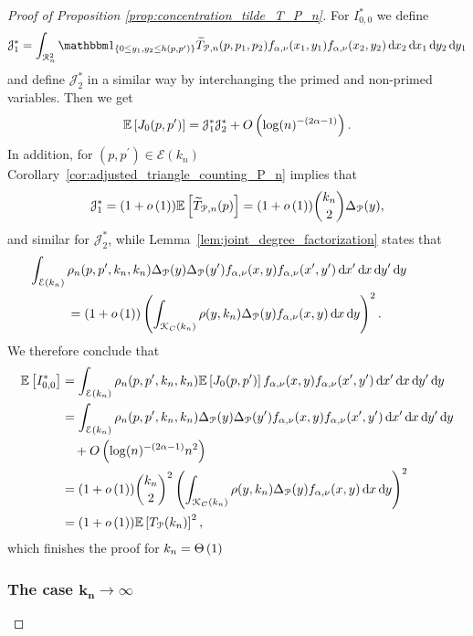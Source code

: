 \begin{proof}[Proof of Proposition \ref{prop:concentration_tilde_T_P_n}]
For $I_{0,0}^\ast$ we define
\[
	\mathcal{J}_1^\ast = \int_{\Rcal_n^2} \ind{0\le y_1, y_2 \le h(p,p^\prime)} \widetilde{T}_{\Pcal,n}(p,p_1,p_2) 
			f_{\alpha,\nu}(x_1,y_1)	f_{\alpha,\nu}(x_2,y_2) \dd x_2 \dd x_1 \dd y_2 \dd y_1
\] 
and define $\mathcal{J}_2^\ast$ in a similar way by interchanging the primed and non-primed variables. Then we get
\[
	\mathbb{E}\left[J_0(p,p^\prime)\right] = \mathcal{J}_1^\ast \mathcal{J}_2^\ast + O\left(\log(n)^{-(2\alpha - 1)}\right).
\]
In addition, for $(p,p^\prime) \in \mathcal{E}(k_n)$ Corollary~\ref{cor:adjusted_triangle_counting_P_n} implies that 
\[
	\mathcal{J}_1^\ast = (1+o\left(1\right))\mathbb{E}\left[\widetilde{T}_{{\mathcal P},n}(p)\right] = (1 + o\left(1\right))\binom{k_n}{2} \Delta_{{\mathcal P}}(y),
\] 
and similar for $\mathcal{J}_2^\ast$, while Lemma~\ref{lem:joint_degree_factorization} states that
\begin{align*}
	&\hspace{-30pt}\int_{\mathcal{E}(k_n)} \rho_{n}(p,p^\prime,k_n,k_n) \Delta_\Pcal(y) \Delta_\Pcal(y^\prime)
		f_{\alpha,\nu}(x,y) f_{\alpha, \nu}(x^\prime, y^\prime) \dd x^\prime \dd x \dd y^\prime \dd y\\
	&= (1+\smallO{1})\left(\int_{\Kcal_C(k_n)} \rho(y,k_n) \Delta_\Pcal(y) f_{\alpha,\nu}(x,y) \dd x \dd y\right)^2.
\end{align*}
We therefore conclude that
\begin{align*}
	\mathbb{E}\left[I_{0,0}^\ast\right] 
	&= \int_{\mathcal{E}(k_n)} \rho_{n}(p,p^\prime,k_n,k_n) \mathbb{E}\left[J_0(p,p^\prime)\right]
		f_{\alpha,\nu}(x,y) f_{\alpha, \nu}(x^\prime, y^\prime) \operatorname{\mathrm{d}\hspace{-2pt}} x^\prime \operatorname{\mathrm{d}\hspace{-2pt}} x \operatorname{\mathrm{d}\hspace{-2pt}} y^\prime \operatorname{\mathrm{d}\hspace{-2pt}} y \\
	&= \int_{\mathcal{E}(k_n)} \rho_{n}(p,p^\prime,k_n,k_n) \Delta_{{\mathcal P}}(y) \Delta_{{\mathcal P}}(y^\prime)
		f_{\alpha,\nu}(x,y) f_{\alpha, \nu}(x^\prime, y^\prime) \operatorname{\mathrm{d}\hspace{-2pt}} x^\prime \operatorname{\mathrm{d}\hspace{-2pt}} x \operatorname{\mathrm{d}\hspace{-2pt}} y^\prime \operatorname{\mathrm{d}\hspace{-2pt}} y\\
	&\hspace{10pt}+ O\left(\log(n)^{-(2\alpha - 1)}n^2\right) \\
	&= (1 + o\left(1\right)) \binom{k_n}{2}^2 
		\left(\int_{{\mathcal K}_C(k_n)} \rho(y,k_n) \Delta_{{\mathcal P}}(y) f_{\alpha,\nu}(x,y) \operatorname{\mathrm{d}\hspace{-2pt}} x \operatorname{\mathrm{d}\hspace{-2pt}} y\right)^2 \\
	&= (1 + o\left(1\right))\mathbb{E}\left[T_{{\mathcal P}}(k_n)\right]^2,
\end{align*}
which finishes the proof for $k_n = \Theta\left(1\right)$

\subsubsection*{The case $\bm{k_n \to \infty}$}


\end{proof}
